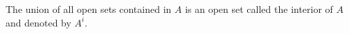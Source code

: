 The union of all open sets contained in $A$ is an open set called the interior of $A$ and denoted by $A^i$.
